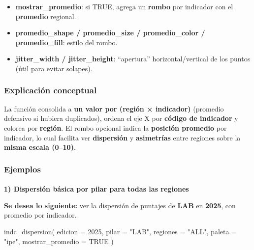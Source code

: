 \documentclass[
  11pt,
  letterpaper,
  DIV=11,
  numbers=noendperiod]{scrartcl}
\makeatletter
\let\oldparagraph\paragraph
\renewcommand{\paragraph}{
    \@ifstar
      \xxxParagraphStar
      \xxxParagraphNoStar
  }
\newcommand{\xxxParagraphStar}[1]{\oldparagraph*{#1}\mbox{}}
\newcommand{\xxxParagraphNoStar}[1]{\oldparagraph{#1}\mbox{}}
\newenvironment{Shaded}{\begin{snugshade}}{\end{snugshade}}
\newcommand{\AttributeTok}[1]{\textcolor[rgb]{0.40,0.45,0.13}{#1}}
\newcommand{\ConstantTok}[1]{\textcolor[rgb]{0.56,0.35,0.01}{#1}}
\newcommand{\DecValTok}[1]{\textcolor[rgb]{0.68,0.00,0.00}{#1}}
\newcommand{\FunctionTok}[1]{\textcolor[rgb]{0.28,0.35,0.67}{#1}}
\newcommand{\NormalTok}[1]{\textcolor[rgb]{0.00,0.23,0.31}{#1}}
\newcommand{\StringTok}[1]{\textcolor[rgb]{0.13,0.47,0.30}{#1}}
\makeatother
\begin{document}
\begin{itemize}
\item
  \textbf{mostrar\_promedio}: si TRUE, agrega un \textbf{rombo} por
  indicador con el \textbf{promedio} regional.
\item
  \textbf{promedio\_shape / promedio\_size / promedio\_color /
  promedio\_fill}: estilo del rombo.
\item
  \textbf{jitter\_width / jitter\_height}: ``apertura''
  horizontal/vertical de los puntos (útil para evitar solapes).
\end{itemize}

\subsubsection{\texorpdfstring{\textbf{Explicación
conceptual}}{Explicación conceptual}}\label{explicaciuxf3n-conceptual-14}

La función consolida a \textbf{un valor por (región × indicador)}
(promedio defensivo si hubiera duplicados), ordena el eje X por
\textbf{código de indicador} y colorea por \textbf{región}. El rombo
opcional indica la \textbf{posición promedio} por indicador, lo cual
facilita ver \textbf{dispersión} y \textbf{asimetrías} entre regiones
sobre la \textbf{misma escala (0--10)}.

\subsubsection{\texorpdfstring{\textbf{Ejemplos}}{Ejemplos}}\label{ejemplos-14}

\paragraph{\texorpdfstring{\textbf{1) Dispersión básica por pilar para
todas las
regiones}}{1) Dispersión básica por pilar para todas las regiones}}\label{dispersiuxf3n-buxe1sica-por-pilar-para-todas-las-regiones}

\textbf{Se desea lo siguiente:} ver la dispersión de puntajes de
\textbf{LAB} en \textbf{2025}, con promedio por indicador.

\begin{Shaded}
\begin{Highlighting}[]
\FunctionTok{indc\_dispersion}\NormalTok{(}
  \AttributeTok{edicion          =} \DecValTok{2025}\NormalTok{,}
  \AttributeTok{pilar            =} \StringTok{"LAB"}\NormalTok{,}
  \AttributeTok{regiones         =} \StringTok{"ALL"}\NormalTok{,}
  \AttributeTok{paleta           =} \StringTok{"ipe"}\NormalTok{,}
  \AttributeTok{mostrar\_promedio =} \ConstantTok{TRUE}
\NormalTok{)}
\end{Highlighting}
\end{Shaded}
\end{document}
